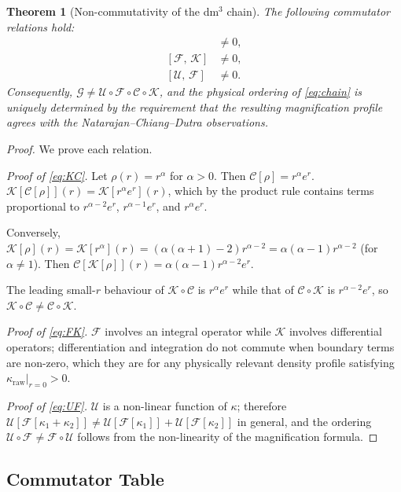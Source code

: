 \documentclass[11pt,a4paper,openright]{book}
\theoremstyle{dm3thm}
\newtheorem{theorem}{Theorem}[chapter]
\theoremstyle{dm3def}
\newcommand{\comm}[2]{[#1,\,#2]}
\newcommand{\GG}{\mathcal{G}}
\newcommand{\UU}{\mathcal{U}}
\newcommand{\FF}{\mathcal{F}}
\newcommand{\KK}{\mathcal{K}}
\newcommand{\CC}{\mathcal{C}}
\begin{document}
\begin{theorem}[Non-commutativity of the dm$^3$ chain]\label{thm:noncomm}
The following commutator relations hold:
\begin{align}
  \comm{\KK}{\CC} &\neq 0, \label{eq:KC}\\
  \comm{\FF}{\KK} &\neq 0, \label{eq:FK}\\
  \comm{\UU}{\FF} &\neq 0. \label{eq:UF}
\end{align}
Consequently, $\GG \neq \UU\circ\FF\circ\CC\circ\KK$, and the physical ordering
of \eqref{eq:chain} is uniquely determined by the requirement that the
resulting magnification profile agrees with the Natarajan--Chiang--Dutra
observations.
\end{theorem}

\begin{proof}
We prove each relation.

\medskip
\noindent\textit{Proof of \eqref{eq:KC}.}\quad
Let $\rho(r) = r^\alpha$ for $\alpha>0$.  Then
$\CC[\rho] = r^\alpha e^r$.
$\KK[\CC[\rho]](r) = \KK[r^\alpha e^r](r)$, which by the product rule contains
terms proportional to $r^{\alpha-2}e^r$, $r^{\alpha-1}e^r$, and $r^\alpha e^r$.

Conversely, $\KK[\rho](r) = \KK[r^\alpha](r) = (\alpha(\alpha+1)-2)r^{\alpha-2}
= \alpha(\alpha-1)r^{\alpha-2}$ (for $\alpha\neq 1$).
Then $\CC[\KK[\rho]](r) = \alpha(\alpha-1)r^{\alpha-2}e^r$.

The leading small-$r$ behaviour of $\KK\circ\CC$ is $r^\alpha e^r$ while that
of $\CC\circ\KK$ is $r^{\alpha-2}e^r$, so $\KK\circ\CC \neq \CC\circ\KK$.

\medskip
\noindent\textit{Proof of \eqref{eq:FK}.}\quad
$\FF$ involves an integral operator while $\KK$ involves differential operators;
differentiation and integration do not commute when boundary terms are non-zero,
which they are for any physically relevant density profile satisfying
$\kappa_{\mathrm{raw}}|_{r=0} > 0$.

\medskip
\noindent\textit{Proof of \eqref{eq:UF}.}\quad
$\UU$ is a non-linear function of $\kappa$; therefore
$\UU[\FF[\kappa_1+\kappa_2]] \neq \UU[\FF[\kappa_1]]+\UU[\FF[\kappa_2]]$
in general, and the ordering $\UU\circ\FF \neq \FF\circ\UU$ follows from the
non-linearity of the magnification formula.
\end{proof}

\subsection{Commutator Table}
\label{ssec:commtable}
\end{document}
